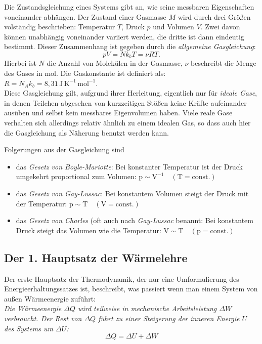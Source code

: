 Die Zustandsgleichung eines Systems gibt an, wie seine messbaren Eigenschaften voneinander abhängen. Der Zustand einer Gasmasse $M$ wird durch drei Größen volständig beschrieben: Temperatur $T$, Druck $p$ und Volumen $V$. Zwei davon können unabhängig voneinander variiert werden, die dritte ist dann eindeutig bestimmt. Dieser Zusammenhang ist gegeben durch die \textit{allgemeine Gasgleichung}:
\begin{equation}
	pV = Nk_bT = \nu RT.
\end{equation}
Hierbei ist $N$ die Anzahl von Molekülen in der Gasmasse, $\nu$ beschreibt die Menge des Gases in mol. Die Gaskonstante ist definiert als: $R = N_A k_b = 8,31\, \mathrm{J\, K^{-1}\, mol^{-1}}$.\\
Diese Gasgleichung gilt, aufgrund ihrer Herleitung, eigentlich nur für \textit{ideale Gase}, in denen Teilchen abgesehen von kurzzeitigen Stößen keine Kräfte aufeinander ausüben und selbst kein messbares Eigenvolumen haben. Viele reale Gase verhalten sich allerdings relativ ähnlich zu einem idealen Gas, so dass auch hier die Gasgleichung als Näherung benutzt werden kann.

Folgerungen aus der Gasgleichung sind
\begin{itemize}
	\item das \textit{Gesetz von Boyle-Mariotte}: Bei konstanter Temperatur ist der Druck umgekehrt proportional zum Volumen: $\mathrm{p\sim V^{-1} \quad (T=const.)}$
	\item das \textit{Gesetz von Gay-Lussac}: Bei konstantem Volumen steigt der Druck mit der Temperatur: $\mathrm{p\sim T \quad (V=const.)}$
	\item das \textit{Gesetz von Charles} (oft auch nach \textit{Gay-Lussac} benannt: Bei konstantem Druck steigt das Volumen wie die Temperatur: $\mathrm{V\sim T \quad (p=const.)}$
\end{itemize}

\subsection{Der 1. Hauptsatz der Wärmelehre}

Der erste Hauptsatz der Thermodynamik, der nur eine Umformulierung des Energieerhaltungssatzes ist, beschreibt, was passiert wenn man einem System von außen Wärmeenergie zuführt:\\
\textit{Die Wärmeenergie $\Delta Q$ wird teilweise in mechanische Arbeitsleistung $\Delta W$ verbraucht. Der Rest von $\Delta Q$ führt zu einer Steigerung der inneren Energie $U$ des Systems um $\Delta U$:}
	\begin{equation}
		\Delta Q = \Delta U + \Delta W
	\end{equation}

